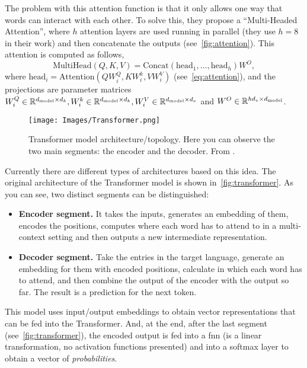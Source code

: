 The problem with this attention function is that it only allows one way that
words can interact with each other. To solve this, they propose a
``Multi-Headed Attention'', where \(h\) attention layers are used running in
parallel (they use \(h = 8\) in their work) and then concatenate the outputs
(see\ \vref{fig:attention}). This attention is computed as follows,
\begin{equation}
  \text{MultiHead}(Q, K, V) =
  \text{Concat}(\text{head}_1, \ldots, \text{head}_h)W^O,
\end{equation}
where \(\text{head}_i = \text{Attention}(QW_i^Q, KW_i^k, VW_i^V)\) (see\
\vref{eq:attention}), and the projections are parameter matrices
\(W_i^Q \in \mathbb{R}^{d_{\text{model}} \times d_k}, W_i^k \in \mathbb{R}^{d_{\text{model}}
  \times d_k}, W_i^V \in \mathbb{R}^{d_{\text{model}} \times d_v}\) and
\(W^O \in \mathbb{R}^{hd_v \times d_{\text{model}}}\).

\begin{figure}[p]
  \centering
  \texttt{[image: Images/Transformer.png]}
  \caption[Transformer model architecture]{Transformer model
    architecture/topology. Here you can observe the two main segments: the
    encoder and the decoder. From
    .}%
  \label{fig:transformer}
\end{figure}

Currently there are different types of architectures based on this idea. The
original architecture of the Transformer model is shown in\
\vref{fig:transformer}. As you can see, two distinct segments can be
distinguished:
\begin{itemize}
  \item \textbf{Encoder segment.} It takes the inputs, generates an embedding
  of them, encodes the positions, computes where each word has to attend to in
  a multi-context setting and then outputs a new intermediate representation.
  \item \textbf{Decoder segment.} Take the entries in the target language,
  generate an embedding for them with encoded positions, calculate in which
  each word has to attend, and then combine the output of the encoder with the
  output so far. The result is a prediction for the next token.
\end{itemize}

This model uses input/output embeddings to obtain vector representations that
can be fed into the Transformer. And, at the end, after the last segment (see\
\vref{fig:transformer}), the encoded output is fed into a \gls{fnn} (is a
linear transformation, no activation functions presented) and into a softmax
layer to obtain a vector of \emph{probabilities}.



